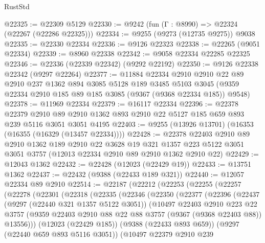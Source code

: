 \begin{lexlean}{RustStd}
\begin{coremodule}
@22325 := @22309 @5129
@22330 := @9242 (fun (Γ : @8990) => @22324 (@22267 (@22286 @22325)))
@22334 := @9255 (@9273 (@12735 @9275)) @9038
@22335 := @22330 @22334
@22336 := @9126 @22323
@22338 := @22265 (@9051 @22334)
@22339 := @8960 @22338
@22342 := @9058 @22334 @22285 @22325
@22346 := @22336 (@22339 @22342) (@9292 @22192)
@22350 := @9126 @22338 @22342 (@9297 @22264)
@22377 := @11884
    @22334
    @2910
    @2910
    @22
    @89
    @2910
    @237
    @1362
    @894
    @3085
    @5128
    @189
    @3485
    @5103
    @3045
    (@9359 @22334 @2910 @185 @89 @185 @3085 (@9367 (@9368 @22334 @185)) @9548)
@22378 := @11969 @22334
@22379 := @16117 @22334
@22396 := @22378
    @22379
    @2910
    @89
    @2910
    @1362
    @893
    @2910
    @22
    @5127
    @185
    @659
    @893
    @239
    @5116
    @3051
    @3051
    @4195
@22403 := @9255 (@13926 @13701) (@16353 (@16355 (@16329 (@13457 @22334))))
@22428 := @22378
    @22403
    @2910
    @89
    @2910
    @1362
    @189
    @2910
    @22
    @3628
    @19
    @321
    @1357
    @223
    @5122
    @3051
    @3051
    @3757
    (@12013 @22334 @2910 @89 @2910 @1362 @2910 @22)
@22429 := @12043 @1362
@22432 := @22428 (@12023 (@22429 @19))
@22433 := @13751 @1362
@22437 := @22432 (@9388 (@22433 @189 @321))
@22440 := @12057 @22334 @89 @2910
@22514 := @22187
    (@22212
      (@22253
        (@22255
          (@22257
            (@22278
              (@22301
                (@22318
                  (@22335
                    (@22346
                      (@22350
                        (@22377
                          (@22396
                            (@22437
                              (@9297 (@22440 @321 @1357 @5122 @3051))
                              (@10497
                                @22403
                                @2910
                                @223
                                @22
                                @3757
                                (@9359
                                  @22403
                                  @2910
                                  @88
                                  @22
                                  @88
                                  @3757
                                  (@9367 (@9368 @22403 @88))
                                  @13556)))
                            (@12023 (@22429 @185))
                            (@9388 (@22433 @893 @659))
                            (@9297 (@22440 @659 @893 @5116 @3051))
                            (@10497
                              @22379
                              @2910
                              @239

\end{coremodule}
\end{lexlean}
